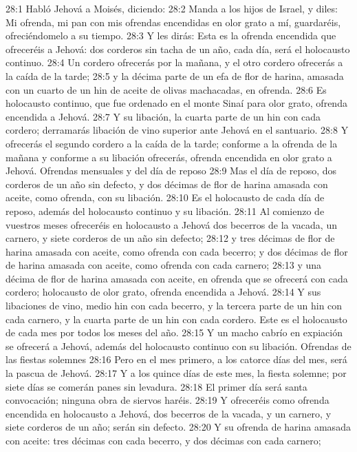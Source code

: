 28:1 Habló Jehová a Moisés, diciendo: 
28:2 Manda a los hijos de Israel, y diles: Mi ofrenda, mi pan con mis ofrendas encendidas en olor grato a mí, guardaréis, ofreciéndomelo a su tiempo.  
28:3 Y les dirás: Esta es la ofrenda encendida que ofreceréis a Jehová: dos corderos sin tacha de un año, cada día, será el holocausto continuo.  
28:4 Un cordero ofrecerás por la mañana, y el otro cordero ofrecerás a la caída de la tarde;  
28:5 y la décima parte de un efa   de flor de harina, amasada con un cuarto de un hin de aceite de olivas machacadas, en ofrenda.  
28:6 Es holocausto continuo, que fue ordenado en el monte Sinaí para olor grato, ofrenda encendida a Jehová.  
28:7 Y su libación, la cuarta parte de un hin   con cada cordero; derramarás libación de vino superior ante Jehová en el santuario.  
28:8 Y ofrecerás el segundo cordero a la caída de la tarde; conforme a la ofrenda de la mañana y conforme a su libación ofrecerás, ofrenda encendida en olor grato a Jehová.  
Ofrendas mensuales y del día de reposo  
28:9 Mas el día de reposo, dos corderos de un año sin defecto, y dos décimas de flor de harina amasada con aceite, como ofrenda, con su libación.  
28:10 Es el holocausto de cada día de reposo, además del holocausto continuo y su libación.  
28:11 Al comienzo de vuestros meses ofreceréis en holocausto a Jehová dos becerros de la vacada, un carnero, y siete corderos de un año sin defecto;  
28:12 y tres décimas de flor de harina amasada con aceite, como ofrenda con cada becerro; y dos décimas de flor de harina amasada con aceite, como ofrenda con cada carnero;  
28:13 y una décima de flor de harina amasada con aceite, en ofrenda que se ofrecerá con cada cordero; holocausto de olor grato, ofrenda encendida a Jehová.  
28:14 Y sus libaciones de vino, medio hin   con cada becerro, y la tercera parte de un hin con cada carnero, y la cuarta parte de un hin con cada cordero. Este es el holocausto de cada mes por todos los meses del año.  
28:15 Y un macho cabrío en expiación se ofrecerá a Jehová, además del holocausto continuo con su libación.  
Ofrendas de las fiestas solemnes   
28:16 Pero en el mes primero, a los catorce días del mes, será la pascua de Jehová.  
28:17 Y a los quince días de este mes, la fiesta solemne; por siete días se comerán panes sin levadura. 
28:18 El primer día será santa convocación; ninguna obra de siervos haréis.  
28:19 Y ofreceréis como ofrenda encendida en holocausto a Jehová, dos becerros de la vacada, y un carnero, y siete corderos de un año; serán sin defecto.  
28:20 Y su ofrenda de harina amasada con aceite: tres décimas con cada becerro, y dos décimas con cada carnero;  
